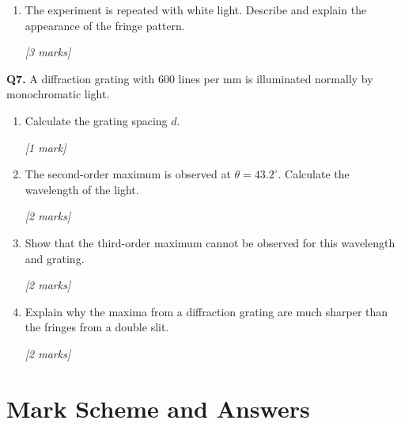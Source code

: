 \begin{tcolorbox}[colback=white, colframe=midblue, breakable]
\begin{minipage}{\linewidth}
\begin{enumerate}[label=(\alph*)]
  \item The experiment is repeated with white light. Describe and explain the appearance of the fringe pattern.
  \par\hfill\textit{[3 marks]}
  \vspace{3.5cm}
\end{enumerate}
\end{minipage}

\begin{minipage}{\linewidth}
\textbf{Q7.} A diffraction grating with $600$ lines per mm is illuminated normally by monochromatic light.

\begin{enumerate}[label=(\alph*)]
  \item Calculate the grating spacing $d$.
  \par\hfill\textit{[1 mark]}
  \vspace{2.5cm}

  \item The second-order maximum is observed at $\theta = 43.2^\circ$. Calculate the wavelength of the light.
  \par\hfill\textit{[2 marks]}
  \vspace{3cm}

  \item Show that the third-order maximum cannot be observed for this wavelength and grating.
  \par\hfill\textit{[2 marks]}
  \vspace{3.5cm}

  \item Explain why the maxima from a diffraction grating are much sharper than the fringes from a double slit.
  \par\hfill\textit{[2 marks]}
  \vspace{3cm}
\end{enumerate}
\end{minipage}

\end{tcolorbox}

\section{Mark Scheme and Answers}

